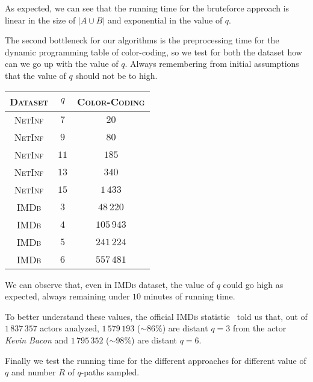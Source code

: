 	As expected, we can see that the running time for the bruteforce approach is linear in the size of $|A \cup B|$ and exponential in the value of $q$.\medskip
	
	The second bottleneck for our algorithms is the preprocessing time for the dynamic programming table of color-coding, so we test for both the dataset how can we go up with the value of $q$. Always remembering from initial assumptions that the value of $q$ should not be to high. 

	\begin{table}[h]
		\centering
		\begin{tabular}{|c|c|c|}
			\hline
			\textsc{Dataset} & $q$  & \textsc{Color-Coding} \\ \hline \hline
			\textsc{NetInf} & $7$  & $20$ \\ \hline
			\textsc{NetInf} & $9$  & $80$ \\ \hline
			\textsc{NetInf} & $11$ & $185$ \\ \hline
			\textsc{NetInf} & $13$ & $340$ \\ \hline
			\textsc{NetInf} & $15$ & $1\,433$ \\ \hline \hline
			\textsc{IMDb}   & $3$  & $48\,220$ \\ \hline
			\textsc{IMDb}   & $4$  & $105\,943$ \\ \hline
			\textsc{IMDb}   & $5$  & $241\,224$ \\ \hline
			\textsc{IMDb}   & $6$  & $557\,481$ \\ \hline
		\end{tabular}
	\end{table}

	We can observe that, even in \textsc{IMDb} dataset, the value of $q$ could go high as expected, always remaining under $10$ minutes of running time. \medskip
	
	To better understand these values, the official \textsc{IMDb} statistic~\cite{imdbstat} told us that, out of $1\,837\,357$ actors analyzed, $1\,579\,193$ ($\sim86\%$) are distant $q=3$ from the actor \textit{Kevin Bacon} and $1\,795\,352$ ($\sim98\%$) are distant $q=6$.\medskip
	
	Finally we test the running time for the different approaches for different value of $q$ and number $R$ of $q$-paths sampled. 
	
